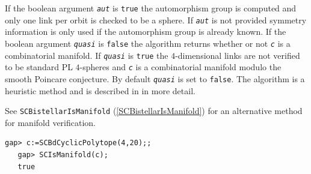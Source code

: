 \documentclass[a4paper,11pt]{report}
\begin{document}
{{{ If the boolean argument \mbox{\texttt{\mdseries\slshape aut}} is \texttt{true} the automorphism group is computed and only one link per orbit is checked to
be a sphere. If \mbox{\texttt{\mdseries\slshape aut}} is not provided symmetry information is only used if the automorphism group is
already known. If the boolean argument \mbox{\texttt{\mdseries\slshape quasi}} is \texttt{false} the algorithm returns whether or not \mbox{\texttt{\mdseries\slshape c}} is a combinatorial manifold. If \mbox{\texttt{\mdseries\slshape quasi}} is \texttt{true} the $4$-dimensional links are not verified to be standard PL $4$-spheres and \mbox{\texttt{\mdseries\slshape c}} is a combinatorial manifold modulo the smooth Poincare conjecture. By default \mbox{\texttt{\mdseries\slshape quasi}} is set to \texttt{false}. The algorithm is a heuristic method and is described in \cite{Paixao143SphereRec} in more detail.

 See \texttt{SCBistellarIsManifold} (\ref{SCBistellarIsManifold}) for an alternative method for manifold verification. 
\begin{Verbatim}[commandchars=!@|,fontsize=\small,frame=single,label=Example]
   gap> c:=SCBdCyclicPolytope(4,20);;
   gap> SCIsManifold(c);
   true
   
\end{Verbatim}
 }

 }

 }

 
\end{document}
